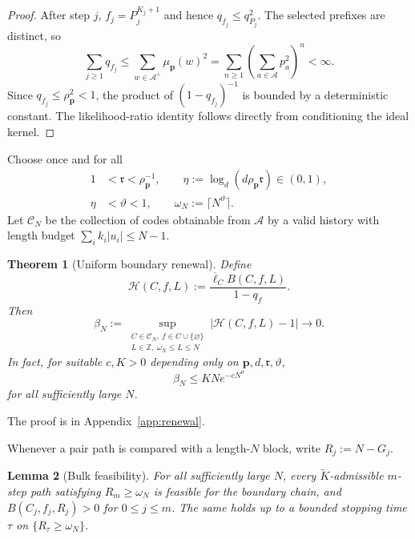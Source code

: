 \documentclass[journal]{IEEEtran}
\theoremstyle{plain}
\newtheorem{theorem}{Theorem}[section]
\newtheorem{lemma}[theorem]{Lemma}
\theoremstyle{definition}
\theoremstyle{remark}
\newcommand{\A}{\mathcal A}
\newcommand{\muP}{\mu_{\mathbf p}}
\newcommand{\rhoP}{\rho_{\mathbf p}}
\newcommand{\lbar}{\overline\ell}
\begin{document}
\begin{proof}
After step $j$, $f_j=P_j^{K_j+1}$ and hence $q_{f_j}\le q_{P_j}^2$.  The selected prefixes are distinct, so
\begin{equation*}
 \sum_{j\ge1}q_{f_j}
 \le\sum_{w\in\A^+}\muP(w)^2
 =\sum_{n\ge1}\left(\sum_{a\in\A}p_a^2\right)^n<\infty.
\end{equation*}
Since $q_{f_j}\le\rhoP^2<1$, the product of $(1-q_{f_j})^{-1}$ is bounded by a deterministic constant.  The likelihood-ratio identity follows directly from conditioning the ideal kernel.
\end{proof}

Choose once and for all
\begin{equation}\label{eq:cutoff-choice}
\begin{aligned}
 1&<\mathfrak r<\rhoP^{-1},\qquad
 \eta:=\log_d(d\rhoP\mathfrak r)\in(0,1),\\
 \eta&<\vartheta<1,\qquad
 \omega_N:=\lceil N^\vartheta\rceil.
\end{aligned}
\end{equation}
Let $\mathcal C_N$ be the collection of codes obtainable from $\A$ by a valid history with length budget $\sum_i k_i|u_i|\le N-1$.

\begin{theorem}[Uniform boundary renewal]\label{thm:uniform-renewal-new}
Define
\begin{equation}\label{eq:H-def}
 \mathcal H(C,f,L):=\frac{\lbar_C B(C,f,L)}{1-q_f}.
\end{equation}
Then
\begin{equation}\label{eq:beta-def}
 \beta_N:=\sup_{\substack{C\in\mathcal C_N,\ f\in C\cup\{\varnothing\}\\
                         L\in\mathbb Z,\ \omega_N\le L\le N}}
 |\mathcal H(C,f,L)-1|\longrightarrow0.
\end{equation}
In fact, for suitable $c,K>0$ depending only on $\mathbf p,d,\mathfrak r,\vartheta$,
\begin{equation}\label{eq:beta-rate}
 \beta_N\le KN e^{-cN^\vartheta}
\end{equation}
for all sufficiently large $N$.
\end{theorem}

The proof is in Appendix~\ref{app:renewal}.

Whenever a pair path is compared with a length-$N$ block, write $R_j:=N-G_j$.

\begin{lemma}[Bulk feasibility]\label{lem:bulk-feasibility}
For all sufficiently large $N$, every $\widetilde K$-admissible $m$-step path satisfying $R_m\ge\omega_N$ is feasible for the boundary chain, and $B(C_j,f_j,R_j)>0$ for $0\le j\le m$.  The same holds up to a bounded stopping time $\tau$ on $\{R_\tau\ge\omega_N\}$.
\end{lemma}
\end{document}
